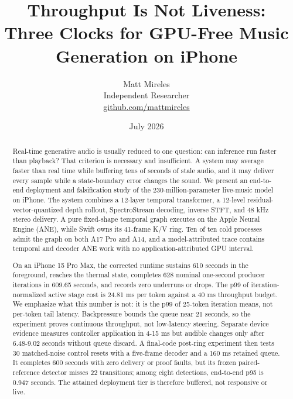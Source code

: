 \documentclass[10pt]{article}
\title{\textbf{Throughput Is Not Liveness:}\\
Three Clocks for GPU-Free Music Generation on iPhone}
\author{Matt Mireles\\Independent Researcher\\\href{https://github.com/mattmireles}{github.com/mattmireles}}
\date{July 2026}
\begin{document}
\maketitle
\begin{abstract}
Real-time generative audio is usually reduced to one question: can inference run faster than playback? That criterion is necessary and insufficient. A system may average faster than real time while buffering tens of seconds of stale audio, and it may deliver every sample while a state-boundary error changes the sound. We present an end-to-end deployment and falsification study of the 230-million-parameter \texttt{} live-music model on iPhone. The system combines a 12-layer temporal transformer, a 12-level residual-vector-quantized depth rollout, SpectroStream decoding, inverse STFT, and 48 kHz stereo delivery. A pure fixed-shape temporal graph executes on the Apple Neural Engine (ANE), while Swift owns its 41-frame K/V ring. Ten of ten cold processes admit the graph on both A17 Pro and A14, and a model-attributed trace contains temporal and decoder ANE work with no application-attributed GPU interval.

On an iPhone 15 Pro Max, the corrected runtime sustains 610 seconds in the foreground, reaches the \texttt{} thermal state, completes 628 nominal one-second producer iterations in 609.65 seconds, and records zero underruns or drops. The p99 of iteration-normalized active stage cost is 24.81 ms per token against a 40 ms throughput budget. We emphasize what this number is not: it is the p99 of 25-token iteration means, not per-token tail latency. Backpressure bounds the queue near 21 seconds, so the experiment proves continuous throughput, not low-latency steering. Separate device evidence measures controller application in 4-15 ms but audible changes only after 6.48-9.02 seconds without queue discard. A final-code post-ring experiment then tests 30 matched-noise control resets with a five-frame decoder and a 160 ms retained queue. It completes 600 seconds with zero delivery or proof faults, but its frozen paired-reference detector misses 22 transitions; among eight detections, end-to-end p95 is 0.947 seconds. The attained deployment tier is therefore buffered, not responsive or live.


\end{abstract}
\end{document}
